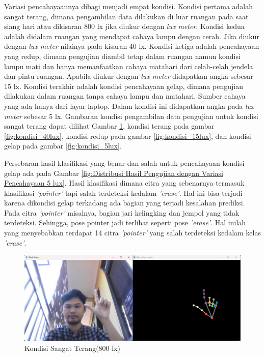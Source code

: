 Variasi pencahayaannya dibagi menjadi empat kondisi. Kondisi pertama adalah sangat terang, dimana pengambilan data dilakukan di luar ruangan pada saat siang hari atau dikisaran 800 lx jika diukur dengan \emph{lux meter}. Kondisi kedua adalah didalam ruangan yang mendapat cahaya lampu dengan cerah. Jika diukur dengan \emph{lux meter} nilainya pada kisaran 40 lx. Kondisi ketiga adalah pencahayaan yang redup, dimana pengujian diambil tetap dalam ruangan namun kondisi lampu mati dan hanya memanfaatkan cahaya matahari dari celah-celah jendela dan pintu ruangan. Apabila diukur dengan \emph{lux meter} didapatkan angka sebesar 15 lx. Kondisi terakhir adalah kondisi pencahayaan gelap, dimana pengujian dilakukan dalam ruangan tanpa cahaya lampu dan matahari. Sumber cahaya yang ada hanya dari layar laptop. Dalam kondisi ini didapatkan angka pada \emph{lux meter} sebesar 5 lx. Gambaran kondisi pengambilan data pengujian untuk kondisi sangat terang dapat dilihat Gambar \ref{fig:kondisi_800lux}, kondisi terang pada gambar \ref{fig:kondisi_40lux}, kondisi redup pada gambar \ref{fig:kondisi_15lux}, dan kondisi gelap pada gambar \ref{fig:kondisi_5lux}.

Persebaran hasil klasifikasi yang benar dan salah untuk pencahayaan kondisi gelap ada pada Gambar \ref{fig:Distribusi Hasil Pengujian dengan Variasi Pencahayaan 5 lux}. Hasil klasifikasi dimana citra yang sebenarnya termasuk klasifikasi \emph{'pointer'} tapi salah terdeteksi kedalam \emph{'erase'}. Hal ini bisa terjadi karena dikondisi gelap terkadang ada bagian yang terjadi kesalahan prediksi. Pada citra \emph{'pointer'} misalnya, bagian jari kelingking dan jempol yang tidak terdeteksi. Sehingga, pose pointer jadi terlihat seperti pose \emph{'erase'}. Hal inilah yang menyebabkan terdapat 14 citra \emph{'pointer'} yang salah terdeteksi kedalam kelas \emph{'erase'}. 

\begin{figure}[!htb]
  \centering
  \includegraphics[scale=0.34]{gambar/pengujian-cahaya/kondisi_800lux.png}
  \caption{Kondisi Sangat Terang(800 lx)}
  \label{fig:kondisi_800lux} 
\end{figure}

